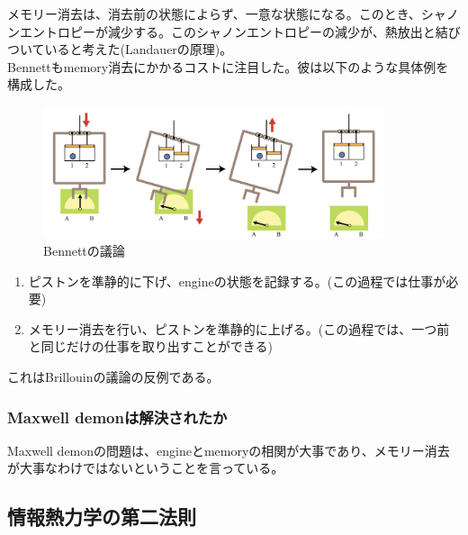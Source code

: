 \documentclass[a4paper,11pt]{jsarticle}
\numberwithin{equation}{section}
\begin{document}
メモリー消去は、消去前の状態によらず、一意な状態になる。このとき、シャノンエントロピーが減少する。このシャノンエントロピーの減少が、熱放出と結びついていると考えた(Landauerの原理)。\\

Bennettもmemory消去にかかるコストに注目した。彼は以下のような具体例を構成した。\\
\begin{figure}[H]
    \begin{center}
    \includegraphics[width=100mm]{Bennett.png}
    \end{center}
    \caption{Bennettの議論}
    \label{fig:Bennett}
\end{figure}
\begin{enumerate}
    \item ピストンを準静的に下げ、engineの状態を記録する。(この過程では仕事が必要)
    \item メモリー消去を行い、ピストンを準静的に上げる。(この過程では、一つ前と同じだけの仕事を取り出すことができる)
\end{enumerate}
これはBrillouinの議論の反例である。\\

\subsubsection{Maxwell demonは解決されたか}
Maxwell demonの問題は、engineとmemoryの相関が大事であり、メモリー消去が大事なわけではないということを言っている。

\subsection{情報熱力学の第二法則}
\end{document}
